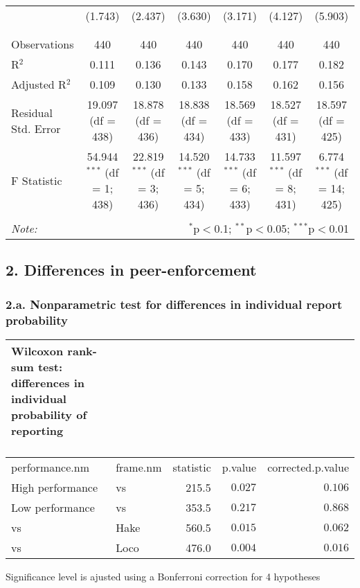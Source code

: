 \documentclass[
]{article}
\begin{document}
\begin{table}[!htbp]
\begin{tabular}{@{\extracolsep{5pt}}lcccccc}
  & (1.743) & (2.437) & (3.630) & (3.171) & (4.127) & (5.903) \\ 
  & & & & & & \\ 
\hline \\[-1.8ex] 
Observations & 440 & 440 & 440 & 440 & 440 & 440 \\ 
R$^{2}$ & 0.111 & 0.136 & 0.143 & 0.170 & 0.177 & 0.182 \\ 
Adjusted R$^{2}$ & 0.109 & 0.130 & 0.133 & 0.158 & 0.162 & 0.156 \\ 
Residual Std. Error & 19.097 (df = 438) & 18.878 (df = 436) & 18.838 (df = 434) & 18.569 (df = 433) & 18.527 (df = 431) & 18.597 (df = 425) \\ 
F Statistic & 54.944$^{***}$ (df = 1; 438) & 22.819$^{***}$ (df = 3; 436) & 14.520$^{***}$ (df = 5; 434) & 14.733$^{***}$ (df = 6; 433) & 11.597$^{***}$ (df = 8; 431) & 6.774$^{***}$ (df = 14; 425) \\ 
\hline 
\hline \\[-1.8ex] 
\textit{Note:}  & \multicolumn{6}{r}{$^{*}$p$<$0.1; $^{**}$p$<$0.05; $^{***}$p$<$0.01} \\ 
\end{tabular} 
\end{table}

\hypertarget{differences-in-peer-enforcement}{%
\subsection{2. Differences in
peer-enforcement}\label{differences-in-peer-enforcement}}

\hypertarget{a.-nonparametric-test-for-differences-in-individual-report-probability}{%
\subsubsection{2.a. Nonparametric test for differences in individual
report
probability}\label{a.-nonparametric-test-for-differences-in-individual-report-probability}}

\captionsetup[table]{labelformat=empty,skip=1pt}
\begin{longtable}{llrrr}
\caption*{
\large Wilcoxon rank-sum test: differences in individual probability of reporting\\ 
\small \\ 
} \\ 
\toprule
performance.nm & frame.nm & statistic & p.value & corrected.p.value \\ 
\midrule
High performance & vs & 215.5 & $0.027$ & $0.106$ \\ 
Low performance & vs & 353.5 & $0.217$ & $0.868$ \\ 
vs & Hake & 560.5 & $0.015$ & $0.062$ \\ 
vs & Loco & 476.0 & $0.004$ & $0.016$ \\ 
\bottomrule
\end{longtable}
\begin{minipage}{\linewidth}
Significance level is ajusted using a Bonferroni correction for 4 hypotheses\\ 
\end{minipage}
\end{document}

